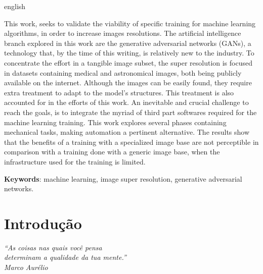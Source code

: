 \documentclass[
	11pt,
	openright,
	oneside,
	a4paper,
	english,
	french,
	spanish,
	brazil,	
	]{abntex2}
\newcommand{\quot}[1]{\begin{flushright} \textit{#1}\end{flushright}}
\begin{document}
\begin{resumo}[Abstract]
\begin{otherlanguage*}{english}

\noindent 

This work, seeks to validate the viability of specific training for machine learning algorithms, in order to increase images resolutions. The artificial intelligence branch explored in this work are the generative adversarial networks (GANs), a technology that, by the time of this writing, is relatively new to the industry. To concentrate the effort in a tangible image subset, the super resolution is focused in datasets containing medical and astronomical images, both being publicly available on the internet. Although the images can be easily found, they require extra treatment to adapt to the model's structures. This treatment is also accounted for in the efforts of this work. An inevitable and crucial challenge to reach the goals, is to integrate the myriad of third part softwares required for the machine learning training. This work explores several phases containing mechanical tasks, making automation a pertinent alternative. The results show that the benefits of a training with a specialized image base are not perceptible in comparison with a training done with a generic image base, when the infrastructure used for the training is limited.

\noindent  
\textbf{Keywords}: machine learning, image super resolution, generative adversarial networks.
\end{otherlanguage*}
\end{resumo}


\renewcommand*{\insertchapterspace}{} 

\listoffigures*
\cleardoublepage

\listoftables*
\cleardoublepage







\textual

\chapter[Introdução]{Introdução}
\quot{``As coisas nas quais você pensa\\determinam a qualidade da tua mente.''\\Marco Aurélio}
\label{chapter:introducao}

\end{document}
